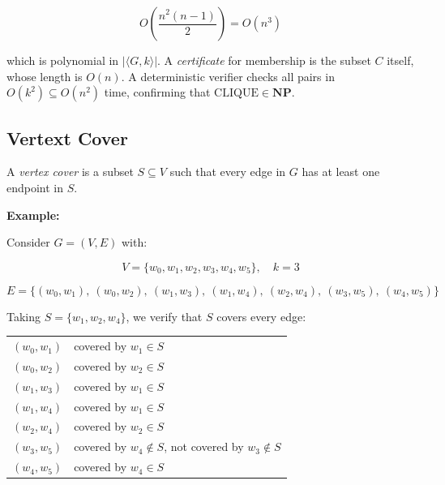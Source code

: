 \documentclass[12pt,a4paper,openany]{article}
\begin{document}
\[
O\!\left(\frac{n^2(n-1)}{2}\right) = O(n^3)
\]

which is polynomial in $|\langle G, k \rangle|$. A \emph{certificate} for membership is the subset $C$ itself, whose length is $O(n)$. A deterministic verifier checks all pairs in $O(k^2) \subseteq O(n^2)$ time, confirming that $\text{CLIQUE} \in \mathbf{NP}$.

\subsection{Vertext Cover}

A \emph{vertex cover} is a subset $S \subseteq V$ such that every edge in $G$ has at least one endpoint in $S$.

\textbf{Example: }

Consider $G = (V, E)$ with:

\begin{center}
\end{center}

\[
V = \{w_0, w_1, w_2, w_3, w_4, w_5\}, \quad k = 3
\]

\[
E = \{(w_0,w_1),\ (w_0,w_2),\ (w_1,w_3),\ (w_1,w_4),\ (w_2,w_4),\ (w_3,w_5),\ (w_4,w_5)\}
\]

Taking $S = \{w_1, w_2, w_4\}$, we verify that $S$ covers every edge:

\begin{center}
\begin{tabular}{ll}
$(w_0, w_1)$ & covered by $w_1 \in S$ \\
$(w_0, w_2)$ & covered by $w_2 \in S$ \\
$(w_1, w_3)$ & covered by $w_1 \in S$ \\
$(w_1, w_4)$ & covered by $w_1 \in S$ \\
$(w_2, w_4)$ & covered by $w_2 \in S$ \\
$(w_3, w_5)$ & covered by $w_4 \notin S$, not covered by $w_3 \notin S$ \\
$(w_4, w_5)$ & covered by $w_4 \in S$ \\
\end{tabular}
\end{center}
\end{document}
